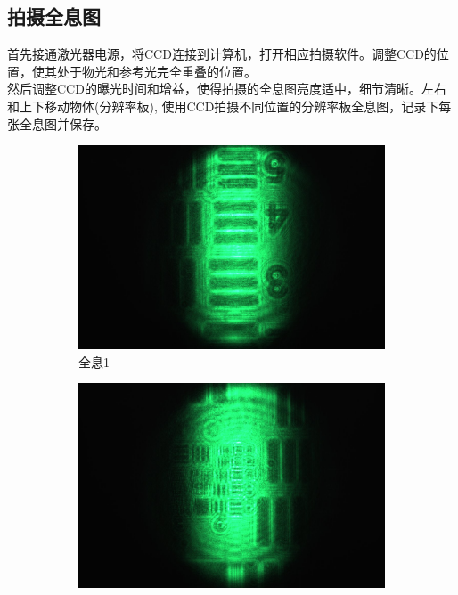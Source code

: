 \documentclass[a4paper,draft]{report} %
\begin{document}
\subsection{拍摄全息图}
首先接通激光器电源，将CCD连接到计算机，打开相应拍摄软件。调整CCD的位置，使其处于物光和参考光完全重叠的位置。\\
然后调整CCD的曝光时间和增益，使得拍摄的全息图亮度适中，细节清晰。左右和上下移动物体(分辨率板),
使用CCD拍摄不同位置的分辨率板全息图，记录下每张全息图并保存。
\begin{figure}[H]
\centering
\begin{subfigure}{0.3\textwidth}
    \centering
    \includegraphics[width=\linewidth]{lizhou1}
    \caption{全息1}
    \label{Fig.sub.1}
\end{subfigure}
\hfill
\begin{subfigure}{0.3\textwidth}
    \centering
    \includegraphics[width=\linewidth]{lizhou2}

\end{subfigure}
\end{figure}
\end{document}
